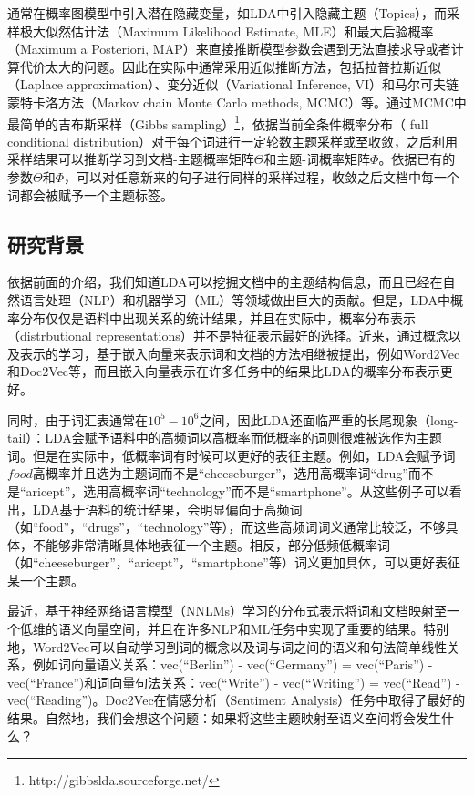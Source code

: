 \documentclass[master]{njuthesis}
\begin{document}
通常在概率图模型中引入潜在隐藏变量，如LDA中引入隐藏主题（Topics），而采样极大似然估计法（Maximum Likelihood Estimate, MLE）和最大后验概率（Maximum a Posteriori, MAP）来直接推断模型参数会遇到无法直接求导或者计算代价太大的问题\cite{blei2003latent}。因此在实际中通常采用近似推断方法，包括拉普拉斯近似（Laplace approximation）\cite{wolfinger1993laplace}、变分近似（Variational Inference, VI）\cite{jordan1999introduction,wainwright2008graphical}和马尔可夫链蒙特卡洛方法（Markov chain Monte Carlo methods, MCMC）\cite{andrieu2003introduction}等。通过MCMC中最简单的吉布斯采样（Gibbs sampling）\footnote{http://gibbslda.sourceforge.net/}，依据当前全条件概率分布（ full conditional
distribution）对于每个词进行一定轮数主题采样或至收敛，之后利用采样结果可以推断学习到文档-主题概率矩阵$\Theta$和主题-词概率矩阵$\Phi$\cite{griffiths2004finding}。依据已有的参数$\Theta$和$\Phi$，可以对任意新来的句子进行同样的采样过程，收敛之后文档中每一个词都会被赋予一个主题标签。

\subsection{研究背景}
依据前面的介绍，我们知道LDA可以挖掘文档中的主题结构信息，而且已经在自然语言处理（NLP）和机器学习（ML）等领域做出巨大的贡献\cite{blei2003latent}。但是，LDA中概率分布仅仅是语料中出现关系的统计结果，并且在实际中，概率分布表示（distrbutional representations）并不是特征表示最好的选择。近来，通过概念以及表示的学习，基于嵌入向量来表示词和文档的方法相继被提出，例如Word2Vec\cite{mikolov2013efficient}和Doc2Vec\cite{le2014distributed}等，而且嵌入向量表示在许多任务中的结果比LDA的概率分布表示更好。

同时，由于词汇表通常在$10^5-10^6$之间，因此LDA还面临严重的长尾现象（long-tail）：LDA会赋予语料中的高频词以高概率而低概率的词则很难被选作为主题词。但是在实际中，低概率词有时候可以更好的表征主题。例如，LDA会赋予词$food$高概率并且选为主题词而不是``cheeseburger''，选用高概率词``drug''而不是``aricept''，选用高概率词``technology''而不是``smartphone''。从这些例子可以看出，LDA基于语料的统计结果，会明显偏向于高频词（如``food''，``drugs''，``technology''等），而这些高频词词义通常比较泛，不够具体，不能够非常清晰具体地表征一个主题。相反，部分低频低概率词（如``cheeseburger''，``aricept''，``smartphone''等）词义更加具体，可以更好表征某一个主题。

最近，基于神经网络语言模型（NNLMs）学习的分布式表示将词和文档映射至一个低维的语义向量空间，并且在许多NLP和ML任务中实现了重要的结果\cite{mikolov2013efficient,le2014distributed}。特别地，Word2Vec可以自动学习到词的概念以及词与词之间的语义和句法简单线性关系，例如词向量语义关系：vec(``Berlin'') - vec(``Germany'') = vec(``Paris'') - vec(``France'')和词向量句法关系：vec(``Write'') - vec(``Writing'') = vec(``Read'') - vec(``Reading'')\cite{mikolov2013linguistic}。Doc2Vec在情感分析（Sentiment Analysis）任务中取得了最好的结果\cite{le2014distributed}。自然地，我们会想这个问题：如果将这些主题映射至语义空间将会发生什么？
\end{document}
